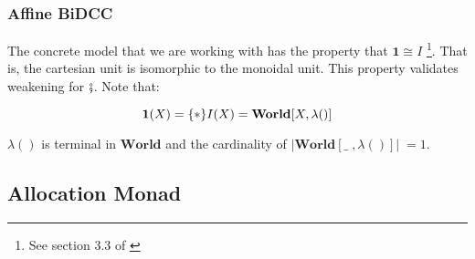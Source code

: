 \documentclass{article}
\newcommand{\world}{{\mathbf{World}}}
\begin{document}
\subsubsection{Affine BiDCC}
The concrete model that we are working with has the property 
that $\mathbf{1} \cong I$ \footnote{See section 3.3 of \cite{pym_semantics_2002}}. 
That is, the cartesian unit is isomorphic to the monoidal unit. 
This property validates weakening for $\fatsemi$. Note that:

\[ 
    \mathbf{1}(X) = \{*\} \\
    I(X) = \world[X , \lambda()]
\]

$\lambda()$ is terminal in $\world$ and the cardinality of $|\world[\_\;,\lambda()]| \;= 1$.
\\
\subsection{Allocation Monad}

\begin{comment}
    \cite{gabbayNewApproachAbstract2002} point to section 7, specifically 
the note about how the notion of finite support does not exist in the presheaf category, but does in the
full subcategory of pullback preserving functors. Additionally, the Shanuel topos models 
classical HOL rather than intuitionistic HOL (because it is a boolean topos? see Larrian note)}
\end{comment}
\end{document}
